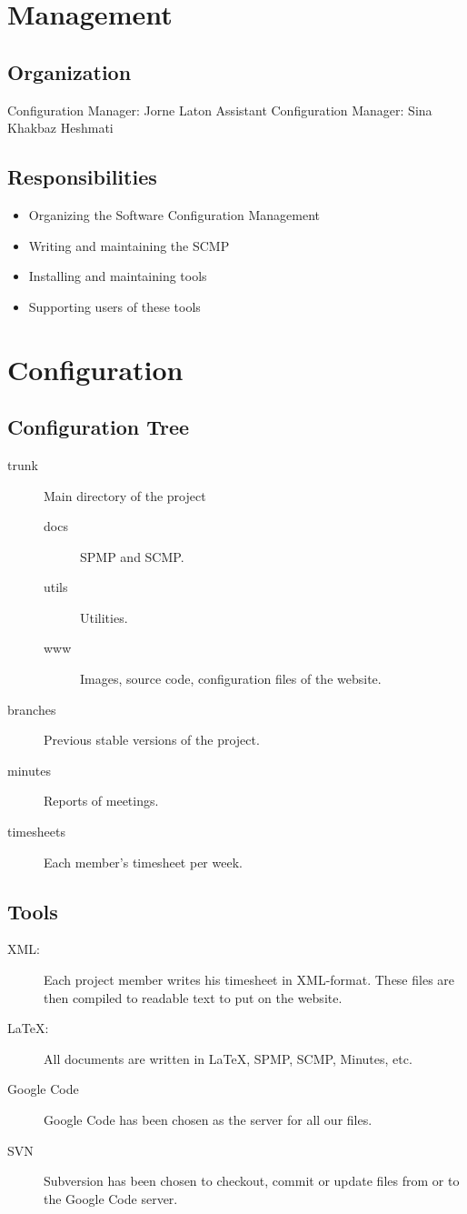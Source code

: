 \documentclass{article}
\begin{document}
\section{Management}
\subsection{Organization}
Configuration Manager: Jorne Laton\n
Assistant Configuration Manager: Sina Khakbaz Heshmati

\subsection{Responsibilities}
\begin{itemize}
	\item Organizing the Software Configuration Management
	\item Writing and maintaining the SCMP
	\item Installing and maintaining tools
	\item Supporting users of these tools
\end{itemize}


\section{Configuration}
\subsection{Configuration Tree}
\begin{description}
\item[trunk]
Main directory of the project
	\begin{description}
	\item[docs]
	SPMP and SCMP.
	\item[utils]
	Utilities.
	\item[www]
	Images, source code, configuration files of the website.
	\end{description}
\item[branches]
Previous stable versions of the project.
\item[minutes]
Reports of meetings.
\item[timesheets]
Each member's timesheet per week.
\end{description}

\subsection{Tools}
\begin{description}
\item[XML:]
	Each project member writes his timesheet in XML-format. These files are then compiled to readable text to put on the website.
\item[\LaTeX{}:]
	All documents are written in \LaTeX{}, SPMP, SCMP, Minutes, etc.
\item[Google Code]
	Google Code has been chosen as the server for all our files.
\item[SVN]
	Subversion has been chosen to checkout, commit or update files from or to the Google Code server.
\end{description}
\end{document}
